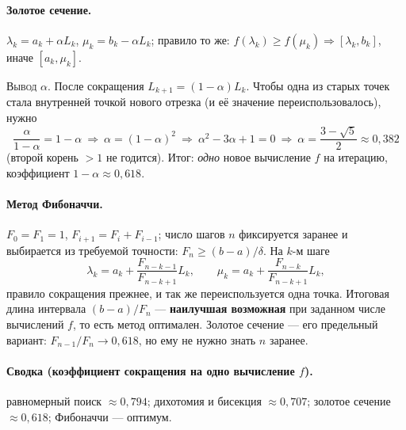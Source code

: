 \paragraph{Золотое сечение.}
$\lambda_k = a_k + \alpha L_k$, $\mu_k = b_k - \alpha L_k$; правило то же:
$f(\lambda_k) \ge f(\mu_k) \Rightarrow [\lambda_k, b_k]$, иначе
$[a_k, \mu_k]$.

\textsc{Вывод $\alpha$.} После сокращения $L_{k+1} = (1-\alpha)L_k$. Чтобы
одна из старых точек стала внутренней точкой нового отрезка (и её значение
переиспользовалось), нужно
\[
  \frac{\alpha}{1-\alpha} = 1 - \alpha
  \ \Rightarrow\ \alpha = (1-\alpha)^2
  \ \Rightarrow\ \alpha^2 - 3\alpha + 1 = 0
  \ \Rightarrow\ \alpha = \frac{3 - \sqrt5}{2} \approx 0{,}382
\]
(второй корень $>1$ не годится). Итог: \emph{одно} новое вычисление $f$ на
итерацию, коэффициент $1-\alpha \approx 0{,}618$.

\paragraph{Метод Фибоначчи.}
$F_0 = F_1 = 1$, $F_{i+1} = F_i + F_{i-1}$; число шагов $n$ фиксируется
заранее и выбирается из требуемой точности: $F_{n} \ge (b-a)/\delta$. На
$k$-м шаге
\[
  \lambda_k = a_k + \frac{F_{n-k-1}}{F_{n-k+1}}L_k ,
  \qquad
  \mu_k = a_k + \frac{F_{n-k}}{F_{n-k+1}}L_k ,
\]
правило сокращения прежнее, и так же переиспользуется одна точка. Итоговая
длина интервала $(b-a)/F_n$ — \textbf{наилучшая возможная} при заданном числе
вычислений $f$, то есть метод оптимален. Золотое сечение — его предельный
вариант: $F_{n-1}/F_n \to 0{,}618$, но ему не нужно знать $n$ заранее.

\paragraph{Сводка (коэффициент сокращения на одно вычисление $f$).}
равномерный поиск $\approx 0{,}794$; дихотомия и бисекция $\approx 0{,}707$;
золотое сечение $\approx 0{,}618$; Фибоначчи — оптимум.

